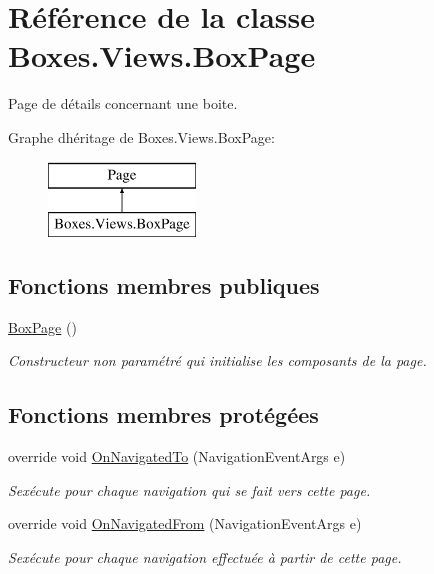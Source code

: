\hypertarget{class_boxes_1_1_views_1_1_box_page}{}\section{Référence de la classe Boxes.\+Views.\+Box\+Page}
\label{class_boxes_1_1_views_1_1_box_page}


Page de détails concernant une boite.  


Graphe d\textquotesingle{}héritage de Boxes.\+Views.\+Box\+Page\+:\begin{figure}[H]
\begin{center}
\leavevmode
\includegraphics[height=2.000000cm]{class_boxes_1_1_views_1_1_box_page}
\end{center}
\end{figure}
\subsection*{Fonctions membres publiques}
\begin{DoxyCompactItemize}
\item 
\hyperlink{class_boxes_1_1_views_1_1_box_page_aa76eb275452e5f8c0eb1f5f01db44ffb}{Box\+Page} ()
\begin{DoxyCompactList}\small\item\em Constructeur non paramétré qui initialise les composants de la page. \end{DoxyCompactList}\end{DoxyCompactItemize}
\subsection*{Fonctions membres protégées}
\begin{DoxyCompactItemize}
\item 
override void \hyperlink{class_boxes_1_1_views_1_1_box_page_aa963e22b35931c7b64b39c3194cdae44}{On\+Navigated\+To} (Navigation\+Event\+Args e)
\begin{DoxyCompactList}\small\item\em S\textquotesingle{}exécute pour chaque navigation qui se fait vers cette page. \end{DoxyCompactList}\item 
override void \hyperlink{class_boxes_1_1_views_1_1_box_page_abd9984ce09cffa193a72ad8d19eeb023}{On\+Navigated\+From} (Navigation\+Event\+Args e)
\begin{DoxyCompactList}\small\item\em S\textquotesingle{}exécute pour chaque navigation effectuée à partir de cette page. \end{DoxyCompactList}\end{DoxyCompactItemize}
